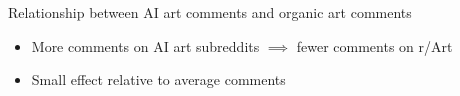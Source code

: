 \documentclass[aspectratio=169]{beamer}
\begin{document}
\begin{frame}{Relationship between AI art comments and organic art comments}
	\centering
	\begin{itemize}
		\item More comments on AI art subreddits $\implies$ fewer comments on r/Art
		\item Small effect relative to average comments
	\end{itemize}
\end{frame}
\end{document}
